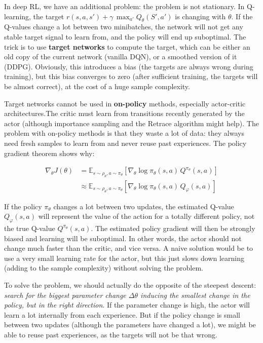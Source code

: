 \documentclass[
  letterpaper,
  DIV=11,
  numbers=noendperiod]{scrreprt}
\begin{document}
In deep RL, we have an additional problem: the problem is not
stationary. In Q-learning, the target
\(r(s, a, s') + \gamma \, \max_{a'} Q_\theta(S', a')\) is changing with
\(\theta\). If the Q-values change a lot between two minibatches, the
network will not get any stable target signal to learn from, and the
policy will end up suboptimal. The trick is to use \textbf{target
networks} to compute the target, which can be either an old copy of the
current network (vanilla DQN), or a smoothed version of it (DDPG).
Obviously, this introduces a bias (the targets are always wrong during
training), but this bias converges to zero (after sufficient training,
the targets will be almost correct), at the cost of a huge sample
complexity.

Target networks cannot be used in \textbf{on-policy} methods, especially
actor-critic architectures.The critic must learn from transitions
recently generated by the actor (although importance sampling and the
Retrace algorithm might help). The problem with on-policy methods is
that they waste a lot of data: they always need fresh samples to learn
from and never reuse past experiences. The policy gradient theorem shows
why:

\[
\begin{aligned}
    \nabla_\theta J(\theta) & =  \mathbb{E}_{s \sim \rho_\theta, a \sim \pi_\theta}[\nabla_\theta \log \pi_\theta(s, a) \, Q^{\pi_\theta}(s, a)] \\
    & \approx  \mathbb{E}_{s \sim \rho_\theta, a \sim \pi_\theta}[\nabla_\theta \log \pi_\theta(s, a) \, Q_\varphi(s, a)]
\end{aligned}
\]

If the policy \(\pi_\theta\) changes a lot between two updates, the
estimated Q-value \(Q_\varphi(s, a)\) will represent the value of the
action for a totally different policy, not the true Q-value
\(Q^{\pi_\theta}(s, a)\). The estimated policy gradient will then be
strongly biased and learning will be suboptimal. In other words, the
actor should not change much faster than the critic, and vice versa. A
naive solution would be to use a very small learning rate for the actor,
but this just slows down learning (adding to the sample complexity)
without solving the problem.

To solve the problem, we should actually do the opposite of the steepest
descent: \emph{search for the biggest parameter change \(\Delta \theta\)
inducing the smallest change in the policy, but in the right direction}.
If the parameter change is high, the actor will learn a lot internally
from each experience. But if the policy change is small between two
updates (although the parameters have changed a lot), we might be able
to reuse past experiences, as the targets will not be that wrong.
\end{document}
